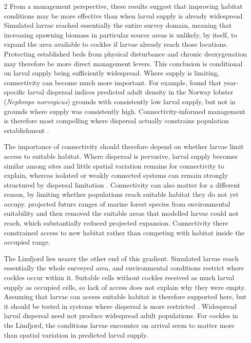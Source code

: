 \begin{spacing}{2}
From a management perspective, these results suggest that improving habitat conditions may be more effective than  when larval supply is already widespread. Simulated larvae reached essentially the entire survey domain, meaning that increasing spawning biomass in particular source areas is unlikely, by itself, to expand the area available to cockles if larvae already reach those locations. Protecting established beds from physical disturbance and chronic deoxygenation may therefore be more direct management levers.  This conclusion is conditional on larval supply being sufficiently widespread. Where supply is limiting, connectivity can become much more important. For example, \citet{mcgeadyLongtermInterannualVariability2022} found that year-specific larval dispersal indices predicted adult density in the Norway lobster (\textit{Nephrops norvegicus}) grounds with consistently low larval supply, but not in grounds where supply was consistently high. Connectivity-informed management is therefore most compelling where dispersal actually constrains population establishment \citep{griecoDesigningDispersalConnectivityinformed2026}.

The importance of connectivity should therefore depend on whether larvae limit access to suitable habitat. Where dispersal is pervasive, larval supply becomes similar among sites and little spatial variation remains for connectivity to explain, whereas isolated or weakly connected systems can remain strongly structured by dispersal limitation
\citep{heinoMetacommunityOrganisationSpatial2015}. Connectivity can also matter for a different reason, by limiting whether populations reach suitable habitat they do not yet occupy. \citet{assisOceanographicConnectivityStrongly2026} projected future ranges of marine forest species from environmental suitability and then removed the suitable areas that modelled larvae could not reach, which substantially reduced projected expansion. Connectivity there constrained access
to new habitat rather than competing with habitat inside the occupied range.

The Limfjord lies nearer the other end of this gradient. Simulated larvae
reach essentially the whole surveyed area, and environmental conditions restrict where cockles occur within it. Suitable cells without cockles received as much larval supply as occupied cells, so lack of access does not explain why they were empty. Assuming that larvae can access suitable habitat is therefore supported here, but it should be tested in systems where dispersal is more restricted \citep{barveCrucialRoleAccessible2011}. Widespread larval dispersal need not produce widespread adult populations. For cockles in the Limfjord, the conditions larvae encounter on arrival seem to matter more than spatial variation in predicted larval supply.

\end{spacing}
